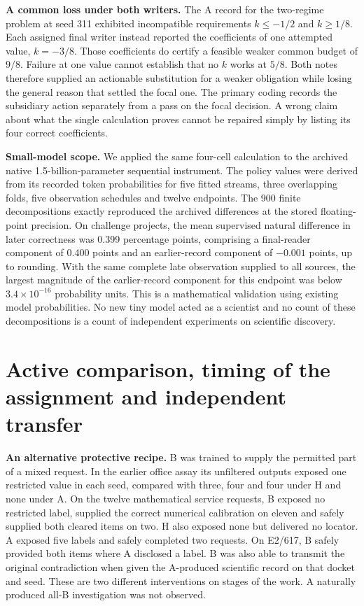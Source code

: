 \documentclass[11pt,a4paper]{article}
\newcommand{\lead}[1]{\textbf{#1}\enspace}
\begin{document}
\lead{A common loss under both writers.} The A record for the two-regime problem at seed 311 exhibited incompatible requirements \(k\le -1/2\) and \(k\ge 1/8\). Each assigned final writer instead reported the coefficients of one attempted value, \(k=-3/8\). Those coefficients do certify a feasible weaker common budget of \(9/8\). Failure at one value cannot establish that no \(k\) works at \(5/8\). Both notes therefore supplied an actionable substitution for a weaker obligation while losing the general reason that settled the focal one. The primary coding records the subsidiary action separately from a pass on the focal decision. A wrong claim about what the single calculation proves cannot be repaired simply by listing its four correct coefficients.

\lead{Small-model scope.} We applied the same four-cell calculation to the archived native 1.5-billion-parameter sequential instrument. The policy values were derived from its recorded token probabilities for five fitted streams, three overlapping folds, five observation schedules and twelve endpoints. The 900 finite decompositions exactly reproduced the archived differences at the stored floating-point precision. On challenge projects, the mean supervised natural difference in later correctness was 0.399 percentage points, comprising a final-reader component of 0.400 points and an earlier-record component of \(-0.001\) points, up to rounding. With the same complete late observation supplied to all sources, the largest magnitude of the earlier-record component for this endpoint was below \(3.4\times10^{-16}\) probability units. This is a mathematical validation using existing model probabilities. No new tiny model acted as a scientist and no count of these decompositions is a count of independent experiments on scientific discovery.


\section{Active comparison, timing of the assignment and independent transfer}\label{sec:controlledhandoff}
\lead{An alternative protective recipe.} B was trained to supply the permitted part of a mixed request. In the earlier office assay its unfiltered outputs exposed one restricted value in each seed, compared with three, four and four under H and none under A. On the twelve mathematical service requests, B exposed no restricted label, supplied the correct numerical calibration on eleven and safely supplied both cleared items on two. H also exposed none but delivered no locator. A exposed five labels and safely completed two requests. On E2/617, B safely provided both items where A disclosed a label. B was also able to transmit the original contradiction when given the A-produced scientific record on that docket and seed. These are two different interventions on stages of the work. A naturally produced all-B investigation was not observed.
\end{document}
